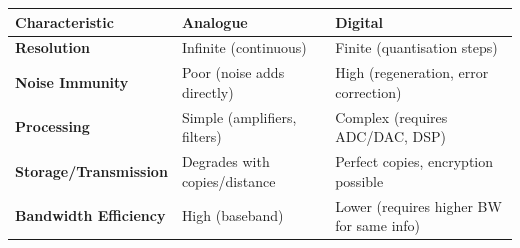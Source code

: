 \documentclass[11pt]{article}
\begin{document}
\begin{aretenir}
\begin{center}
\begin{tabularx}{\linewidth}{|l|X|X|}
\hline
\rowcolor{popblueL}
\textbf{Characteristic} & \textbf{Analogue} & \textbf{Digital} \\ \hline
\textbf{Resolution} & Infinite (continuous) & Finite (quantisation steps) \\ \hline
\textbf{Noise Immunity} & Poor (noise adds directly) & High (regeneration, error correction) \\ \hline
\textbf{Processing} & Simple (amplifiers, filters) & Complex (requires ADC/DAC, DSP) \\ \hline
\textbf{Storage/Transmission} & Degrades with copies/distance & Perfect copies, encryption possible \\ \hline
\textbf{Bandwidth Efficiency} & High (baseband) & Lower (requires higher BW for same info) \\ \hline
\end{tabularx}
\end{center}
\end{aretenir}
\end{document}
